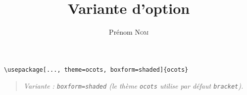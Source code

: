 \documentclass[11pt]{ocots-book}
\title{Variante d'option}
\author{Prénom \textsc{Nom}}
\newcommand{\ocotsvariantnote}[1]{\begin{quote}\itshape Variante : #1\end{quote}}
\begin{document}
\maketitle

\begin{lstlisting}
\usepackage[..., theme=ocots, boxform=shaded]{ocots}
\end{lstlisting}
\ocotsvariantnote{\texttt{boxform=shaded} (le th\`eme \texttt{ocots} utilise par d\'efaut \texttt{bracket}).}

\end{document}
